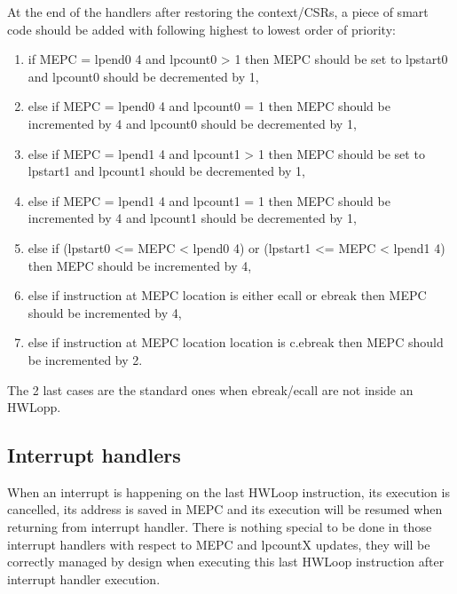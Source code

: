 \documentclass[letterpaper,10pt,english]{sphinxmanual}
\begin{document}
\sphinxAtStartPar
At the end of the handlers after restoring the context/CSRs, a piece of smart code should be added with following highest to lowest order of priority:
\begin{enumerate}
%
\item {} 
\sphinxAtStartPar
if MEPC = lpend0 \sphinxhyphen{} 4 and lpcount0 \textgreater{} 1 then MEPC should be set to lpstart0 and lpcount0 should be decremented by 1,

\item {} 
\sphinxAtStartPar
else if MEPC = lpend0 \sphinxhyphen{} 4 and lpcount0 = 1 then MEPC should be incremented by 4 and lpcount0 should be decremented by 1,

\item {} 
\sphinxAtStartPar
else if MEPC = lpend1 \sphinxhyphen{} 4 and lpcount1 \textgreater{} 1 then MEPC should be set to lpstart1 and lpcount1 should be decremented by 1,

\item {} 
\sphinxAtStartPar
else if MEPC = lpend1 \sphinxhyphen{} 4 and lpcount1 = 1 then MEPC should be incremented by 4 and lpcount1 should be decremented by 1,

\item {} 
\sphinxAtStartPar
else if (lpstart0 \textless{}= MEPC \textless{} lpend0 \sphinxhyphen{} 4) or (lpstart1 \textless{}= MEPC \textless{} lpend1 \sphinxhyphen{} 4) then MEPC should be incremented by 4,

\item {} 
\sphinxAtStartPar
else if instruction at MEPC location is either ecall or ebreak then MEPC should be incremented by 4,

\item {} 
\sphinxAtStartPar
else if instruction at MEPC location location is c.ebreak then MEPC should be incremented by 2.

\end{enumerate}

\sphinxAtStartPar
The 2 last cases are the standard ones when ebreak/ecall are not inside an HWLopp.


\subsection{Interrupt handlers}
\label{\detokenize{corev_hw_loop:interrupt-handlers}}
\sphinxAtStartPar
When an interrupt is happening on the last HWLoop instruction, its execution is cancelled, its address is saved in MEPC and its execution will be resumed when returning from interrupt handler.
There is nothing special to be done in those interrupt handlers with respect to MEPC and lpcountX updates, they will be correctly managed by design when executing this last HWLoop instruction after interrupt handler execution.
\end{document}
